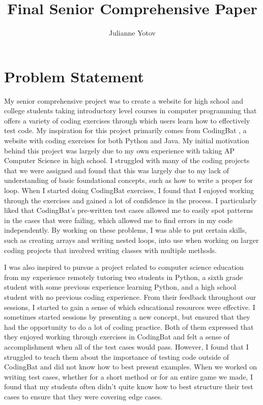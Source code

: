 \documentclass[10pt,twocolumn]{article}
\title{Final Senior Comprehensive Paper}
\author{Julianne Yotov}
\affiliation{Occidental College}
\begin{document}
\maketitle

\section{Problem Statement}

My senior comprehensive project was to create a website for high school and college students taking introductory level courses in computer programming that offers a variety of coding exercises through which users learn how to effectively test code. My inspiration for this project primarily comes from CodingBat \cite{CodingBat}, a website with coding exercises for both Python and Java. My initial motivation behind this project was largely due to my own experience with taking AP Computer Science in high school. I struggled with many of the coding projects that we were assigned and found that this was largely due to my lack of understanding of basic foundational concepts, such as how to write a proper for loop. When I started doing CodingBat exercises, I found that I enjoyed working through the exercises and gained a lot of confidence in the process. I particularly liked that CodingBat’s pre-written test cases allowed me to easily spot patterns in the cases that were failing, which allowed me to find errors in my code independently. By working on these problems, I was able to put certain skills, such as creating arrays and writing nested loops, into use when working on larger coding projects that involved writing classes with multiple methods.

I was also inspired to pursue a project related to computer science education from my experience remotely tutoring two students in Python, a sixth grade student with some previous experience learning Python, and a high school student with no previous coding experience. From their feedback throughout our sessions, I started to gain a sense of which educational resources were effective. I sometimes started sessions by presenting a new concept, but ensured that they had the opportunity to do a lot of coding practice. Both of them expressed that they enjoyed working through exercises in CodingBat and felt a sense of accomplishment when all of the test cases would pass. However, I found that I struggled to teach them about the importance of testing code outside of CodingBat and did not know how to best present examples. When we worked on writing test cases, whether for a short method or for an entire game we made, I found that my students often didn’t quite know how to best structure their test cases to ensure that they were covering edge cases. 
\end{document}
